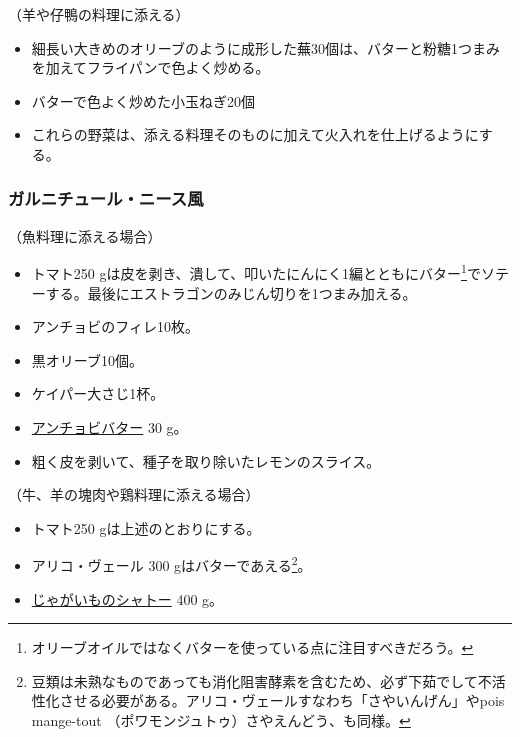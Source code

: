 \begin{recette}


（羊や仔鴨の料理に添える）

\begin{itemize}
\item
  細長い大きめのオリーブのように成形した蕪30個は、バターと粉糖1つまみを加えてフライパンで色よく炒める。
\item
  バターで色よく炒めた小玉ねぎ20個
\item
  これらの野菜は、添える料理そのものに加えて火入れを仕上げるようにする。
\end{itemize}

\atoaki{}

\hypertarget{garniture-nicoise}{%
\subsubsection{ガルニチュール・ニース風}\label{garniture-nicoise}}



（魚料理に添える場合）

\begin{itemize}
\item
  トマト250
  gは皮を剥き、潰して、叩いたにんにく1編とともにバター\footnote{オリーブオイルではなくバターを使っている点に注目すべきだろう。}でソテーする。最後にエストラゴンのみじん切りを1つまみ加える。
\item
  アンチョビのフィレ10枚。
\item
  黒オリーブ10個。
\item
  ケイパー大さじ1杯。
\item
  \protect\hyperlink{beurre-d-anchois}{アンチョビバター} 30 g。
\item
  粗く皮を剥いて、種子を取り除いたレモンのスライス。
\end{itemize}

（牛、羊の塊肉や鶏料理に添える場合）

\begin{itemize}
\item
  トマト250 gは上述のとおりにする。
\item
  アリコ・ヴェール 300 gはバターであえる\footnote{豆類は未熟なものであっても消化阻害酵素を含むため、必ず下茹でして不活性化させる必要がある。アリコ・ヴェールすなわち「さやいんげん」やpois
    mange-tout （ポワモンジュトゥ）さやえんどう、も同様。}。
\item
  \protect\hyperlink{pommes-de-terre-chateau}{じゃがいものシャトー} 400
  g。
\end{itemize}


\end{recette}
